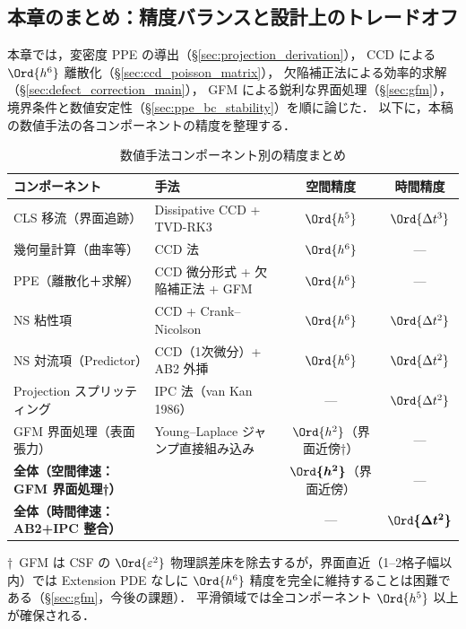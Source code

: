 %
\subsection{本章のまとめ：精度バランスと設計上のトレードオフ}
\label{sec:pressure_accuracy_summary}

本章では，変密度 PPE の導出（§\ref{sec:projection_derivation}），
CCD による $\Ord{h^6}$ 離散化（§\ref{sec:ccd_poisson_matrix}），
欠陥補正法による効率的求解（§\ref{sec:defect_correction_main}），
GFM による鋭利な界面処理（§\ref{sec:gfm}），
境界条件と数値安定性（§\ref{sec:ppe_bc_stability}）を順に論じた．
以下に，本稿の数値手法の各コンポーネントの精度を整理する．

\begin{table}[htbp]
\centering
\caption{数値手法コンポーネント別の精度まとめ}
\label{tab:accuracy_summary}
\renewcommand{\arraystretch}{1.3}
\small
\begin{tabular}{llcc}
\toprule
コンポーネント & 手法 & 空間精度 & 時間精度 \\
\midrule
CLS 移流（界面追跡） & Dissipative CCD + TVD-RK3 & $\Ord{h^5}$ & $\Ord{\Delta t^3}$ \\
幾何量計算（曲率等） & CCD 法 & $\Ord{h^6}$ & — \\
PPE（離散化＋求解） & CCD 微分形式 + 欠陥補正法 + GFM & $\Ord{h^6}$ & — \\
NS 粘性項 & CCD + Crank--Nicolson & $\Ord{h^6}$ & $\Ord{\Delta t^2}$ \\
NS 対流項（Predictor） & CCD（1次微分）+ AB2 外挿 & $\Ord{h^6}$ & $\Ord{\Delta t^2}$ \\
Projection スプリッティング & IPC 法（van Kan 1986） & — & $\Ord{\Delta t^2}$ \\
GFM 界面処理（表面張力） & Young--Laplace ジャンプ直接組み込み & $\Ord{h^2}$（界面近傍†） & — \\
\midrule
\textbf{全体（空間律速：GFM 界面処理†）} & & $\boldsymbol{\Ord{h^2}}$（界面近傍） & — \\
\textbf{全体（時間律速：AB2+IPC 整合）} & & — & $\boldsymbol{\Ord{\Delta t^2}}$ \\
\bottomrule
\end{tabular}

\smallskip
\noindent†\ GFM は CSF の $\Ord{\varepsilon^2}$ 物理誤差床を除去するが，界面直近（1–2格子幅以内）では
Extension PDE なしに $\Ord{h^6}$ 精度を完全に維持することは困難である（§\ref{sec:gfm}，今後の課題）．
平滑領域では全コンポーネント $\Ord{h^5}$ 以上が確保される．
\end{table}

